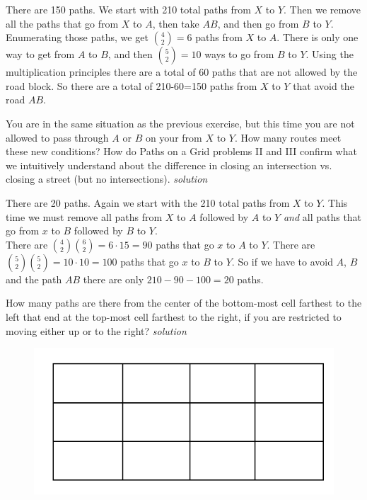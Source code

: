 \documentclass{amsbook}
\begin{document}
\begin{Answer}[ref={c3}]
    There are 150 paths. We start with 210 total paths from $X$ to $Y$. Then we remove all the paths that go from $X$ to $A$, then take $AB$, and then go from $B$ to $Y$. Enumerating those paths, we get ${4 \choose 2} =6$ paths from $X$ to $A$. There is only one way to get from $A$ to $B$, and then ${5\choose 2}=10$ ways to go from $B$ to $Y$. Using the multiplication principles there are a total of 60 paths that are not allowed by the road block. So there are a total of 210-60=150 paths from $X$ to $Y$ that avoid the road $AB$.
\end{Answer}

\begin{Exercise}[title ={Paths on a Grid IIIb}, difficulty=2, label=c4]
    You are in the same situation as the previous exercise, but this time you are not allowed to pass through $A$ or $B$ on your from $X$ to $Y$. How many routes meet these new conditions? How do Paths on a Grid problems II and III confirm what we intuitively understand about the difference in closing an intersection vs. closing a street (but no intersections).  \hfill \emph{solution} 
\end{Exercise}

\begin{Answer}[ref={c4}]
    There are 20 paths. Again we start with the 210 total paths from $X$ to $Y$. This time we must remove all paths from $X$ to $A$ followed by $A$ to $Y$ \emph{and} all paths that go from $x$ to $B$ followed by $B$ to $Y$.\\
    There are ${4\choose 2}{6\choose 2}=6\cdot 15=90$ paths that go $x$ to $A$ to $Y$. There are ${5\choose 2}{5\choose 2}=10\cdot 10=100$ paths that go $x$ to $B$ to $Y$. So if we have to avoid $A$, $B$ and the path $AB$ there are only $210-90-100=20$ paths.
\end{Answer}

\begin{Exercise}[title={Paths from Cell-to-Cell}, difficulty=1, label=c5]
    How many paths are there from the center of the bottom-most cell farthest to the left that end at the top-most cell farthest to the right, if you are restricted to moving either up or to the right? \hfill \emph{solution} 
    \begin{figure}[H]
        \includegraphics[width=.4\linewidth]{e.png}
    \end{figure}  
\end{Exercise}
\end{document}
